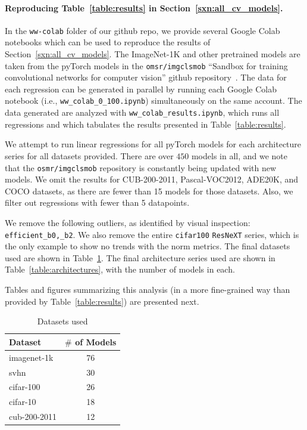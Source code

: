 \paragraph{Reproducing Table~\ref{table:results} in Section~\ref{sxn:all_cv_models}. }

In the \texttt{ww-colab} folder of our github repo, we provide several Google Colab notebooks which can be used to reproduce the results of Section~\ref{sxn:all_cv_models}.
The ImageNet-1K and other pretrained models are taken from the pyTorch models in the \texttt{omsr/imgclsmob} 
``Sandbox for training convolutional networks for computer vision'' github repository~\cite{osmr}.
The data for each regression can be generated in parallel by running each Google Colab notebook (i.e., \texttt{ww\_colab\_0\_100.ipynb}) simultaneously on the same account.
The data generated are analyzed with \texttt{ww\_colab\_results.ipynb}, which runs all regressions and which tabulates the results presented in Table~\ref{table:results}.

We attempt to run linear regressions for all pyTorch models for each architecture series for all datasets provided.  
There are over $450$ models in all, and we note that the \texttt{osmr/imgclsmob} repository is constantly being updated with new models.
We omit the results for CUB-200-2011, Pascal-VOC2012, ADE20K, and COCO datasets, as there are fewer than 15 models for those datasets.  
Also, we filter out regressions with fewer than 5 datapoints.

We remove the following outliers, as identified by visual inspection: \texttt{efficient\_b0,\_b2}.
We also remove the entire \texttt{cifar100} \texttt{ResNeXT} series, which is the only example to show no trends with the norm metrics.
%
The final datasets used are shown in Table~\ref{table:datasets}.
The final architecture series used are shown in  Table~\ref{table:architectures}, with the number of models in each.

Tables and figures summarizing this analysis (in a more fine-grained way than provided by Table~\ref{table:results}) are presented next.

\begin{table}[t]
\small
\begin{center}
\begin{tabular}{|p{1in}|c|}
\hline
Dataset & $\#$ of Models \\
\hline
imagenet-1k   &  76 \\
svhn          &  30 \\
cifar-100     &  26 \\
cifar-10      &  18 \\
cub-200-2011  &  12 \\
\hline
\end{tabular}
\end{center}
\caption{Datasets used}
\label{table:datasets}
\end{table}


